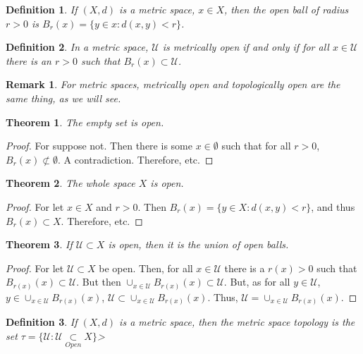 \documentclass[12pt,oneside]{book}
\theoremstyle{mystyle}
\newtheorem{theorem}{Theorem}[section]
\newtheorem{definition}{Definition}[section]
\newtheorem{remark}{Remark}[section]
\begin{document}
\begin{definition}
If $(X,d)$ is a metric space, $x\in X$, then the open ball of radius $r>0$ is $B_{r}(x) = \{y\in x: d(x,y)<r\}$.
\end{definition}

\begin{definition}
In a metric space, $\mathcal{U}$ is metrically open if and only if for all $x\in \mathcal{U}$ there is an $r>0$ such that $B_{r}(x)\subset \mathcal{U}$.
\end{definition}

\begin{remark}
For metric spaces, metrically open and topologically open are the same thing, as we will see.
\end{remark} 

\begin{theorem}
The empty set is open.
\end{theorem}
\begin{proof}
For suppose not. Then there is some $x\in \emptyset$ such that for all $r>0$, $B_{r}(x)\not\subset \emptyset$. A contradiction. Therefore, etc.
\end{proof}

\begin{theorem}
The whole space $X$ is open.
\end{theorem}
\begin{proof}
For let $x\in X$ and $r>0$. Then $B_{r}(x) = \{y\in X:d(x,y)<r\}$, and thus $B_{r}(x)\subset X$. Therefore, etc.
\end{proof}

\begin{theorem}
If $\mathcal{U}\subset X$ is open, then it is the union of open balls.
\end{theorem}
\begin{proof}
For let $\mathcal{U} \subset X$ be open. Then, for all $x\in \mathcal{U}$ there is a $r(x)>0$ such that $B_{r(x)}(x) \subset \mathcal{U}$. But then $\cup_{x\in \mathcal{U}}B_{r(x)}(x)\subset \mathcal{U}$. But, as for all $y\in \mathcal{U}$, $y\in \cup_{x\in \mathcal{U}}B_{r(x)}(x)$, $\mathcal{U} \subset \cup_{x\in \mathcal{U}}B_{r(x)}(x)$. Thus, $\mathcal{U}= \cup_{x\in \mathcal{U}}B_{r(x)}(x)$.
\end{proof}

\begin{definition}
If $(X,d)$ is a metric space, then the metric space topology is the set $\tau = \{\mathcal{U}:\mathcal{U}\underset{Open}\subset X\}$>
\end{definition}
\end{document}
